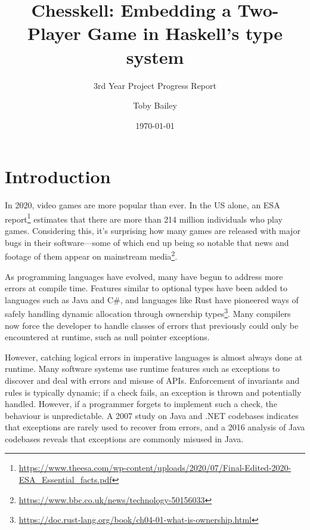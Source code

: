 \documentclass[12pt, a4paper, bibliography=totocnumbered]{scrartcl}
\title{Chesskell: Embedding a Two-Player Game in Haskell's type system}
\subtitle{3rd Year Project Progress Report}
\author{Toby Bailey}
\date{\today}
\begin{document}
\begin{titlepage}
    \maketitle
    \tableofcontents
\end{titlepage}

\section{Introduction}

In 2020, video games are more popular than ever. In the US alone, an ESA report\footnote{\url{https://www.theesa.com/wp-content/uploads/2020/07/Final-Edited-2020-ESA_Essential_facts.pdf}} estimates that there are more than 214 million individuals who play games. Considering this, it's surprising how many games are released with major bugs in their software---some of which end up being so notable that news and footage of them appear on mainstream media\footnote{\url{https://www.bbc.co.uk/news/technology-50156033}}.

As programming languages have evolved, many have begun to address more errors at compile time. Features similar to optional types have been added to languages such as Java and C\#, and languages like Rust have pioneered ways of safely handling dynamic allocation through ownership types\footnote{\url{https://doc.rust-lang.org/book/ch04-01-what-is-ownership.html}}. Many compilers now force the developer to handle classes of errors that previously could only be encountered at runtime, such as null pointer exceptions.


However, catching logical errors in imperative languages is almost always done at runtime. Many software systems use runtime features such as exceptions to discover and deal with errors and misuse of APIs. Enforcement of invariants and rules is typically dynamic; if a check fails, an exception is thrown and potentially handled. However, if a programmer forgets to implement such a check, the behaviour is unpredictable. A 2007 study \cite{exceptionsusedpoorly} on Java and .NET codebases indicates that exceptions are rarely used to recover from errors, and a 2016 analysis of Java codebases \cite{badjavaexceptions} reveals that exceptions are commonly misused in Java.
\end{document}
